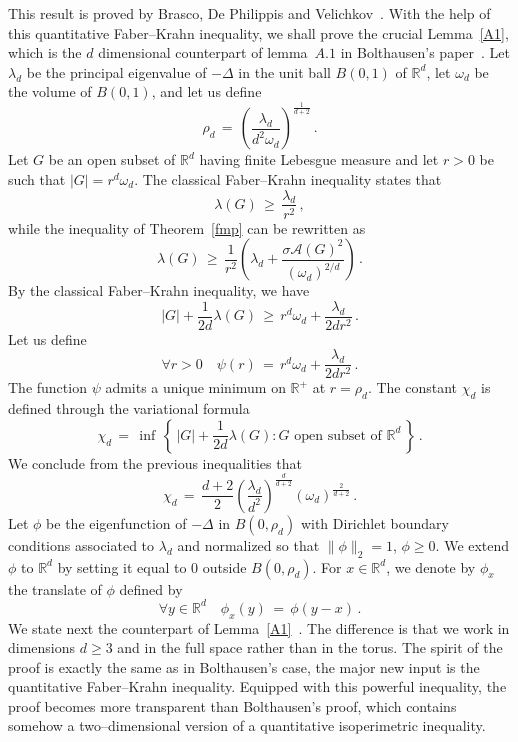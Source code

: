 \documentclass[AHL, Unicode, longabstracts, published]{cedram}
\newcommand*\Rd {{\mathbb R^d}}
\newcommand*\R{\mathbb{R}}
\newcommand{\cA}{\mathcal{A}}
\let\oldforall\forall
\renewcommand*{\forall}{\mathrel{\oldforall}}
\begin{document}
This result is proved by Brasco, De Philippis and Velichkov~\cite{BLGV}. With the help of this quantitative Faber--Krahn inequality, we shall prove the crucial Lemma~\ref{A1}, which is the $d$ dimensional counterpart of lemma~$A.1$ in Bolthausen's paper~\cite{BO}. Let $\lambda_d$ be the principal eigenvalue of $-\Delta$ in the unit ball $B(0,1)$ of $\Rd$, let $\omega_d$ be the volume of $B(0,1)$, and let us define
\[
\rho_d\,=\,\left(\frac{\lambda_d}{d^2\omega_d}\right)^{\textstyle\frac{1}{d+2}}\,.
\]
Let $G$ be an open subset of $\Rd$ having finite Lebesgue measure and let $r>0$ be such that $|G|=r^d\omega_d$. The classical Faber--Krahn inequality states that
\begin{equation}\label{cfkr}
\lambda(G)
\,\geq\,
\frac{\lambda_d}{r^{2}}
\,,
\end{equation}
while the inequality of Theorem~\ref{fmp} can be rewritten as
\begin{equation}\label{fkr}
\lambda(G)
\,\geq\,
\frac{1}{r^{2}}\left(\lambda_d+
\frac{ \sigma\cA(G)^2 }{(\omega_d)^{2/d}}
\right)\,.
\end{equation}
By the classical Faber--Krahn inequality, we have
\[
|G|+\frac{1}{2d}\lambda(G)\,\geq\,
r^d\omega_d+ \frac{\lambda_d}{2dr^{2}}\,.
\]
Let us define
\begin{equation}\label{psir}
\forall r>0\quad\psi(r)\,=\, r^d\omega_d+ \frac{\lambda_d}{2dr^{2}}\,.
\end{equation}
The function $\psi$ admits a unique minimum on $\R^+$ at $r=\rho_d$. The constant $\chi_d$ is defined through the variational formula
\[
\chi_d\,=\,\inf\,\left\{\,|G|+\frac{1}{2d}\lambda(G):
G\text{ open subset of }\Rd\,\right\}\,.
\]
We conclude from the previous inequalities that
\[
\chi_d\,=\,\frac{d+2}{2}\left(\frac{\lambda_d}{d^2}\right)^{\textstyle\frac{d}{d+2}}
(\omega_d)^{\textstyle\frac{2}{d+2}}\,.
\]
Let $\phi$ be the eigenfunction of $-\Delta$ in $B(0,\rho_d)$ with Dirichlet boundary conditions associated to $\lambda_d$ and normalized so that $\|\phi\|_2=1$, $\phi\geq 0$. We extend $\phi$ to $\Rd$ by setting it equal to $0$ outside $B(0,\rho_d)$. For $x\in\Rd$, we denote by $\phi_x$ the translate of $\phi$ defined by
\[
\forall y\in\Rd\quad\phi_x(y)\,=\,\phi(y-x)\,.
\]
We state next the counterpart of Lemma~\ref{A1}~\cite[Lemma~A.1 of Bolthausen's paper]{BO}. The difference is that we work in dimensions $d\geq 3$ and in the full space rather than in the torus. The spirit of the proof is exactly the same as in Bolthausen's case, the major new input is the quantitative Faber--Krahn inequality. Equipped with this powerful inequality, the proof becomes more transparent than Bolthausen's proof, which contains somehow a two--dimensional version of a quantitative isoperimetric inequality.
\goodbreak
\end{document}
